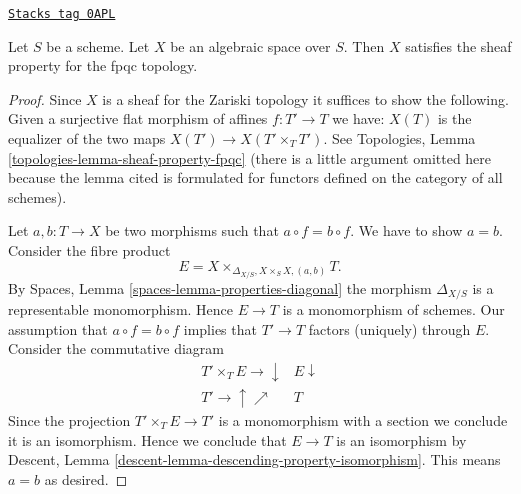 \begin{proposition}[Gabber]

\label{spaces-properties-proposition-sheaf-fpqc}
\href{https://stacks.math.columbia.edu/tag/0APL}{\texttt{Stacks tag 0APL}}

Let $S$ be a scheme. Let $X$ be an algebraic space over $S$. Then
$X$ satisfies the sheaf property for the fpqc topology.
\end{proposition}

\begin{proof}
Since $X$ is a sheaf for the Zariski topology it suffices to show
the following. Given a surjective flat morphism of affines
$f : T' \to T$ we have:
$X(T)$ is the equalizer of the two maps $X(T') \to X(T' \times_T T')$.
See Topologies, Lemma \ref{topologies-lemma-sheaf-property-fpqc}
(there is a little argument omitted here because the lemma cited
is formulated for functors defined on the category of all schemes).

\medskip\noindent
Let $a, b : T \to X$ be two morphisms such that $a \circ f = b \circ f$.
We have to show $a = b$. Consider the fibre product
$$
E = X \times_{\Delta_{X/S}, X \times_S X, (a, b)} T.
$$
By Spaces, Lemma \ref{spaces-lemma-properties-diagonal}
the morphism $\Delta_{X/S}$ is a representable monomorphism. Hence
$E \to T$ is a monomorphism of schemes. Our assumption that
$a \circ f = b \circ f$ implies that $T' \to T$ factors (uniquely) through $E$.
Consider the commutative diagram
$$
\begin{array}{cc}T' \times_T E \longrightarrow\downarrow & E \downarrow \\ T' \longrightarrow\uparrow\nearrow & T\end{array}
$$
Since the projection $T' \times_T E \to T'$ is a monomorphism
with a section we conclude it is an isomorphism. Hence we conclude that
$E \to T$ is an isomorphism by
Descent, Lemma \ref{descent-lemma-descending-property-isomorphism}.
This means $a = b$ as desired.


\end{proof}
